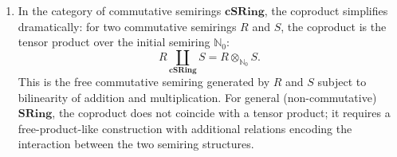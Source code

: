 \begin{proposition}
\begin{enumerate}
    \item [\textbf{(cSRing)}] In the category of commutative semirings $\mathbf{cSRing}$, the coproduct simplifies dramatically: for two commutative semirings $R$ and $S$, the coproduct is the tensor product over the initial semiring $\mathbb{N}_0$:
    $$R \coprod_{\mathbf{cSRing}} S = R \otimes_{\mathbb{N}_0} S.$$
    This is the free commutative semiring generated by $R$ and $S$ subject to bilinearity of addition and multiplication. For general (non-commutative) $\mathbf{SRing}$, the coproduct does not coincide with a tensor product; it requires a free-product-like construction with additional relations encoding the interaction between the two semiring structures.
\end{enumerate}
\end{proposition}

